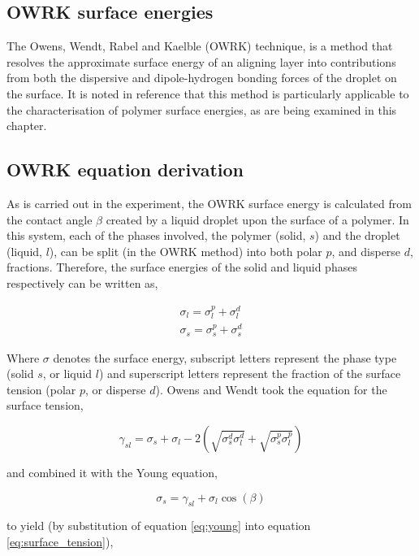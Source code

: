 \subsection{OWRK surface energies}
\label{sec:owrk}
The Owens, Wendt, Rabel and Kaelble (OWRK) technique, is a method that resolves the approximate surface energy of an aligning layer into contributions from both the dispersive and dipole-hydrogen bonding forces of the droplet on the surface. It is noted in reference \cite{Owens1969} that this method is particularly applicable to the characterisation of polymer surface energies, as are being examined in this chapter. 

\subsection{OWRK equation derivation}
As is carried out in the experiment, the OWRK surface energy is calculated from the contact angle $\beta$ created by a liquid droplet upon the surface of a polymer. In this system, each of the phases involved, the polymer (solid, $s$) and the droplet (liquid, $l$), can be split (in the OWRK method) into both polar $p$, and disperse $d$, fractions. Therefore, the surface energies of the solid and liquid phases respectively can be written as,

\begin{eqnarray}
\sigma_l=\sigma_l^p+\sigma_l^d\\
\sigma_s=\sigma_s^p+\sigma_s^d
\end{eqnarray}

Where $\sigma$ denotes the surface energy, subscript letters represent the phase type (solid $s$, or liquid $l$) and superscript letters represent the fraction of the surface tension (polar $p$, or disperse $d$). Owens and Wendt took the equation for the surface tension,

\begin{equation}
\gamma_{sl}=\sigma_s+\sigma_l-2\left(\sqrt{\sigma_s^d\sigma_l^d}+\sqrt{\sigma_s^p\sigma_l^p}\right)
\label{eq:surface_tension}
\end{equation}

\noindent and combined it with the Young equation,

\begin{equation}
\sigma_s=\gamma_{sl}+\sigma_l\cos{\left(\beta\right)}
\label{eq:young}
\end{equation}

\noindent to yield (by substitution of equation \ref{eq:young} into equation \ref{eq:surface_tension}),

